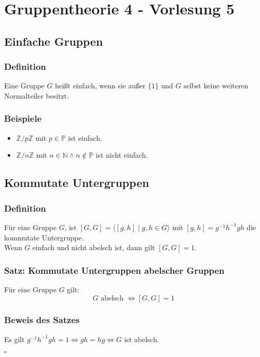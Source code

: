 \documentclass[12pt, german]{article}
\newcommand{\N}{\mathbb{N}}
\newcommand{\bewiesen}{
	
	\begin{flushright}
		$\square$  \\
\end{flushright}}
\begin{document}
	\section{Gruppentheorie 4 - Vorlesung 5}
	\subsection{Einfache Gruppen}
	\subsubsection{Definition}
	Eine Gruppe $G$ hei\ss t einfach, wenn sie außer $\{1\}$ und $G$ selbst keine weiteren Normalteiler besitzt.
	
	\subsubsection{Beispiele}
	\begin{itemize}
		\item $\mathbb Z / p \mathbb Z$ mit $p \in \mathbb{P}$ ist einfach. 
		\item $\mathbb Z / n \mathbb Z$ mit $n \in \N \wedge n \notin \mathbb{P}$ ist nicht einfach. 
	\end{itemize}
	
	\subsection{Kommutate Untergruppen}
	\subsubsection{Definition}
	Für eine Gruppe $G$, ist $[G, G] = \langle [g, h] \mid g, h \in G \rangle$ mit $[g, h] = g^{-1}h^{-1}gh$ die kommutate Untergruppe. \\
	\newline
	Wenn $G$ einfach und nicht abelsch ist, dann gilt $[G, G] =1$. 
	
	\subsubsection{Satz: Kommutate Untergruppen abelscher Gruppen}
	Für eine Gruppe $G$ gilt: $$ G \text{ abelsch } \iff [G, G] = 1$$
	
	\subsubsection{Beweis des Satzes}
	Es gilt $g^{-1}h^{-1}gh = 1 \iff gh = hg \iff G$ ist abelsch. 
	\bewiesen
	
\end{document}
